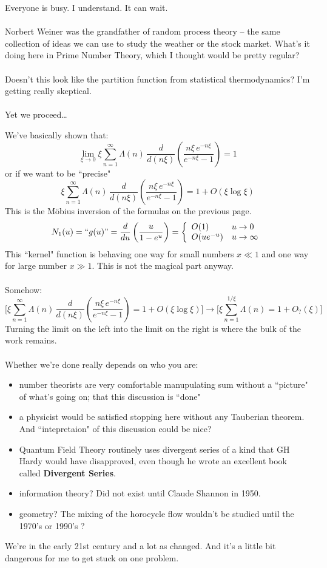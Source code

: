 \documentclass[12pt]{article}
\begin{document}
Everyone is busy.  I understand.  It can wait. \\ \\
Norbert Weiner was the grandfather of random process theory -- the same collection of ideas we can use to study the weather or the stock market.  What's it doing here in Prime Number Theory, which I thought would be pretty regular? \\ \\
Doesn't this look like the partition function from statistical thermodynamics?  I'm getting really skeptical.   \\ \\Yet we proceed\dots

\newpage

\noindent We've basically shown that:
$$ \lim_{\xi \to 0} \xi \sum_{n=1}^\infty  \Lambda(n) \, \frac{d}{d(n\xi)} \left( \frac{ n \xi \, e^{-n\xi}}{e^{-n\xi}-1} \right) = 1$$
or if we want to be ``precise"
$$ \xi \sum_{n=1}^\infty \Lambda(n) \,  \frac{d}{d(n\xi)} \left( \frac{ n \xi \, e^{-n\xi}}{e^{-n\xi}-1} \right) = 1 + O(\xi \log \xi) $$
This is the M\"{o}bius inversion of the formulas on the previous page.
$$N_1(u) = ``g(u)"  = \frac{d}{du} \left( \frac{  u }{ 1 - e^u} \right)
= \left\{ \begin{array}{ll}
O(1) & u \to 0 \\
O(ue^{-u}) & u \to \infty
 \end{array} \right.$$
This ``kernel" function is behaving one way for small numbers $x \ll 1$ and one way for large number $x \gg 1$.  This is not the magical part anyway. \\ \\
Somehow:
$$ \Bigg[ \xi \sum_{n=1}^\infty \Lambda(n) \,  \frac{d}{d(n\xi)} \left( \frac{ n \xi \, e^{-n\xi}}{e^{-n\xi}-1} \right) = 1 + O(\xi \log \xi) \Bigg]
\to \Bigg[ \xi \sum_{n=1}^{1/\xi} \Lambda(n)  = 1 + O_?(\xi) \Bigg] $$
Turning the limit on the left into the limit on the right is where the bulk of the work remains.   \\ \\
Whether we're done really depends on who you are:
\begin{itemize}
\item number theorists are very comfortable manupulating sum without a ``picture" of what's going on; that this discussion is ``done"
\item a physicist would be satisfied stopping here without any Tauberian theorem.  And ``intepretaion" of this discussion could be nice? 
\item Quantum Field Theory routinely uses divergent series of a kind that GH Hardy would have disapproved, even though he wrote an excellent book called \textbf{Divergent Series}.
\item information theory? Did not exist until Claude Shannon in 1950.
\item geometry?  The mixing of the horocycle flow wouldn't be studied until the 1970's or 1990's ?
\end{itemize}
We're in the early 21st century and a lot as changed.  And it's a little bit dangerous for me to get stuck on one problem.
\end{document}
